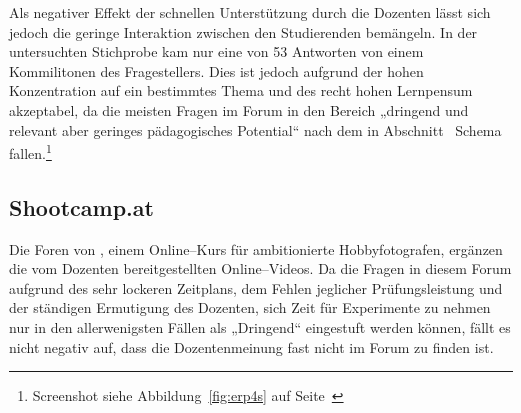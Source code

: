 Als negativer Effekt der schnellen Unterstützung durch die Dozenten lässt sich jedoch die geringe Interaktion zwischen den Studierenden bemängeln. In der untersuchten Stichprobe kam nur eine von 53 Antworten von einem Kommilitonen des Fragestellers. Dies ist jedoch aufgrund der hohen Konzentration auf ein bestimmtes Thema und des recht hohen Lernpensum akzeptabel, da die meisten Fragen im Forum in den Bereich „dringend und relevant aber geringes pädagogisches Potential“ nach dem in Abschnitt~ Schema fallen.\footnote{Screenshot siehe Abbildung~\ref{fig:erp4s} auf Seite~\pageref{fig:erp4s}}

\subsection{Shootcamp.at} %
\label{sub:shootcamp_at}

Die Foren von , einem Online–Kurs für ambitionierte Hobbyfotografen, ergänzen die vom Dozenten bereitgestellten Online–Videos. Da die Fragen in diesem Forum aufgrund des sehr lockeren Zeitplans, dem Fehlen jeglicher Prüfungsleistung und der ständigen Ermutigung des Dozenten, sich Zeit für Experimente zu nehmen nur in den allerwenigsten Fällen als „Dringend“ eingestuft werden können, fällt es nicht negativ auf, dass die Dozentenmeinung fast nicht im Forum zu finden ist. 

